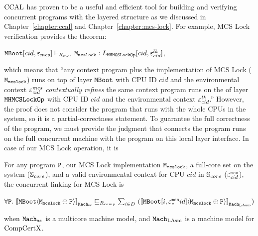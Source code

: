 $\mathrm{CCAL}$
has proven to be a useful and efficient tool 
for building and verifying concurrent programs with the layered structure
as we discussed in Chapter~\ref{chapter:ccal} and Chapter~\ref{chapter:mcs-lock}.
For example, MCS Lock verification provides
the theorem:
\begin{center}
${\mathrm{\texttt{MBoot}}}[cid, {\varepsilon}_{mcs}] \vdash_{R_{mcs}} {\mathrm{\texttt{M}}}_{{\mathrm{\texttt{mcslock}}}} : L_{{\mathrm{\texttt{MHMCSLockOp}}}}[cid, {\varepsilon}^{lk}_{cid}]$,
\end{center}
which means that ``any context program plus the implementation of MCS Lock (${\mathrm{\texttt{M}}}_{{\mathrm{\texttt{mcslock}}}}$) runs on top of 
  layer ${\mathrm{\texttt{MBoot}}}$ with CPU ID $cid$ and the environmental context ${\varepsilon}^{mcs}_{cid}$ \textit{contextually refines}
 the same context program runs on the of  layer ${\mathrm{\texttt{MHMCSLockOp}}}$ with CPU ID $cid$ and the environmental context ${\varepsilon}^{lk}_{cid}$.''
However, the proof does not consider the program that runs with the whole CPUs in the system, so it is a partial-correctness statement. 
To guarantee the full correctness of the program,
we must provide the judgment that connects the program runs on the full concurrent machine with the program on this local layer interface. 
In case of our MCS Lock operation, it is 
\begin{definition}
\label{definition:conlink:con-linking-for-mcs-lock}
For any program $ {\mathrm{\texttt{P}}}$, our MCS Lock implementation ${\mathrm{\texttt{M}}}_{{\mathrm{\texttt{mcslock}}}}$, a full-core set on the system (${\mathbb{S}_{core}}$), and a valid environmental context for CPU  $cid$ in ${\mathbb{S}_{core}}$ (${\varepsilon}^{{\mathrm{\texttt{mcs}}}}_{cid}$), the concurrent linking for MCS Lock is 
\begin{center}
$\forall \codeinmath{P}. \ \semwmachine{\mmcsbootfull}{\codeinmath{M}_{\codeinmath{mcslock}} \oplus \codeinmath{P}}{\hardwarestepkwd} \refines_{R_{comp}} \sum_{i \in D}\  (\semwmachine{\PLayer{\mmcsbootfull}{i}{\oracle^{\codeinmath{mcs}}_cid}}{\codeinmath{M}_{\codeinmath{mcslock}} \oplus \codeinmath{P}}{\lasmmach})$
\end{center}
when  ${{{{\mathrm{\texttt{Mach}}}}_{\mathrm{\texttt{mc}}}}}$ is a multicore machine model, and 
${\mathrm{\texttt{Mach}}}_{\mathrm{LAsm}}$ is a machine model for $\mathrm{CompCertX}$.
\end{definition}

